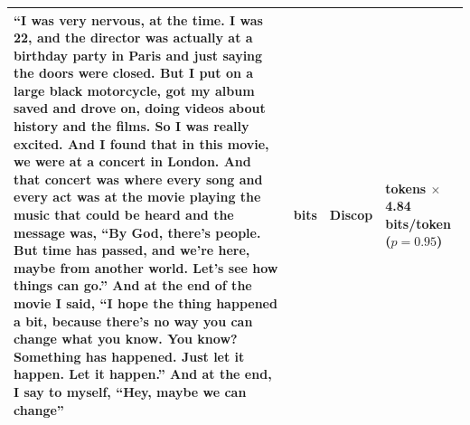 \begin{longtable}{|>{\raggedright\arraybackslash}p{10cm}|>{\raggedright\arraybackslash}p{1.2cm}|>{\raggedright\arraybackslash}p{1cm}|>{\raggedright\arraybackslash}p{2cm}|}
  ``I was very nervous, at the time. I was 22, and the director was actually at a birthday party in Paris and just saying the doors were closed. But I put on a large black motorcycle, got my album saved and drove on, doing videos about history and the films. So I was really excited. And I found that in this movie, we were at a concert in London. And that concert was where every song and every act was at the movie playing the music that could be heard and the message was, ``By God, there's people. But time has passed, and we're here, maybe from another world. Let's see how things can go.'' And at the end of the movie I said, ``I hope the thing happened a bit, because there's no way you can change what you know. You know? Something has happened. Just let it happen. Let it happen.'' And at the end, I say to myself, ``Hey, maybe we can change''                                                                                                                                                                                                                                                                                                                                                                                                                                                                                                                                                                                                                                                                                                                                                                                                                                                                                                                                                                                                                                                                                                                                                                                                                                                                                                                                                                                      & 968 bits     & Discop          & 200 tokens $\times$ 4.84 bits/token ($p=0.95$)         \\ \hline
\end{longtable}
\endgroup
\twocolumn
\fi

